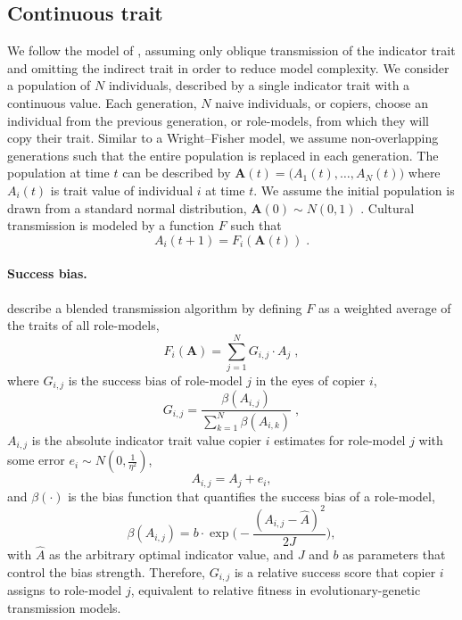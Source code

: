 \documentclass[12pt]{extarticle}
\let\vec\mathbf
\begin{document}
\subsection*{Continuous trait}
We follow the model of \citet{evolutionBook}, assuming only oblique transmission of the indicator trait and omitting the indirect trait in order to reduce model complexity. 
We consider a population of $N$ individuals, described by a single indicator trait with a continuous value.
Each generation, $N$ naive individuals, or copiers, choose an individual from the previous generation, or role-models, from which they will copy their trait. Similar to a Wright–Fisher model, we assume non-overlapping generations such that the entire population is replaced in each generation.
The population at time $t$ can be described by $\vec{A}(t)=\big(A_{1}(t), \ldots, A_{N}(t)\big)$ where $A_{i}(t)$ is trait value of individual $i$ at time $t$. We assume the initial population is drawn from a standard normal distribution, $\vec{A}(0) \sim N(0,1)$ .
Cultural transmission is modeled by a function $F$ such that 
\begin{equation}\label{eq:transmission}
A_{i}(t+1) = F_i(\vec{A}(t)) \;.
\end{equation}

\paragraph{Success bias.}
\citet[Ch.8, p.247-249]{evolutionBook} describe a blended transmission algorithm by defining $F$ as a weighted average of the traits of all role-models, 
\begin{equation}\label{eq:boydF}
F_i(\vec{A}) = \sum_{j=1}^N G_{i,j}\cdot A_{j} \;, 
\end{equation}
where $G_{i,j}$ is the success bias of role-model $j$ in the eyes of copier $i$,
\begin{equation}\label{eq:boydG}
G_{i,j} = \frac{\beta(A_{i,j})}{\sum_{k=1}^{N} \beta(A_{i,k})} \;,
\end{equation}
$A_{i,j}$ is the absolute indicator trait value copier $i$ estimates for role-model $j$ with some error $e_i \sim N(0,\frac{1}{\eta^2})$,
\begin{equation}\label{eq:relativeIndicator}
A_{i,j} = A_j + e_i,
\end{equation}
and $\beta(\cdot)$ is the bias function that quantifies the success bias of a role-model,
\begin{equation}\label{eq:success_bias}
\beta(A_{i,j}) = b \cdot \exp{\Big(-\frac{(A_{i,j} - \hat{A})^2}{2J}\Big)},
\end{equation} 
with $\hat{A}$ as the arbitrary optimal indicator value, and $J$ and $b$ as parameters that control the bias strength.
Therefore, $G_{i,j}$ is a relative success score that copier $i$ assigns to role-model $j$, equivalent to relative fitness in evolutionary-genetic transmission models.
\end{document}

